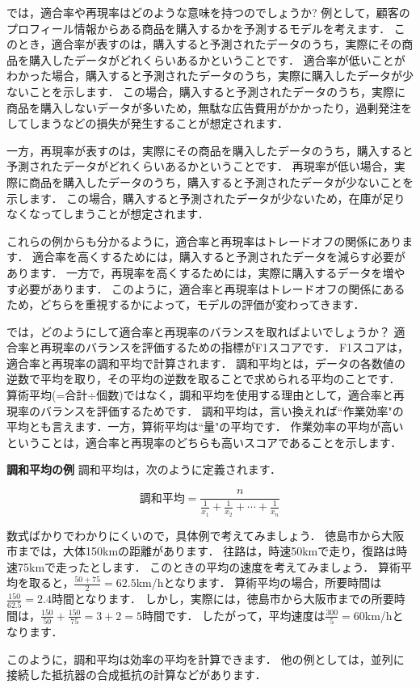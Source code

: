 \documentclass{jarticle}
\begin{document}
では，適合率や再現率はどのような意味を持つのでしょうか?
例として，顧客のプロフィール情報からある商品を購入するかを予測するモデルを考えます．
このとき，適合率が表すのは，購入すると予測されたデータのうち，実際にその商品を購入したデータがどれくらいあるかということです．
適合率が低いことがわかった場合，購入すると予測されたデータのうち，実際に購入したデータが少ないことを示します．
この場合，購入すると予測されたデータのうち，実際に商品を購入しないデータが多いため，無駄な広告費用がかかったり，過剰発注をしてしまうなどの損失が発生することが想定されます．

一方，再現率が表すのは，実際にその商品を購入したデータのうち，購入すると予測されたデータがどれくらいあるかということです．
再現率が低い場合，実際に商品を購入したデータのうち，購入すると予測されたデータが少ないことを示します．
この場合，購入すると予測されたデータが少ないため，在庫が足りなくなってしまうことが想定されます．

これらの例からも分かるように，適合率と再現率はトレードオフの関係にあります．
適合率を高くするためには，購入すると予測されたデータを減らす必要があります．
一方で，再現率を高くするためには，実際に購入するデータを増やす必要があります．
このように，適合率と再現率はトレードオフの関係にあるため，どちらを重視するかによって，モデルの評価が変わってきます．

では，どのようにして適合率と再現率のバランスを取ればよいでしょうか？
適合率と再現率のバランスを評価するための指標がF1スコアです．
F1スコアは，適合率と再現率の調和平均で計算されます．
調和平均とは，データの各数値の逆数で平均を取り，その平均の逆数を取ることで求められる平均のことです．
算術平均(=合計$\div$個数)ではなく，調和平均を使用する理由として，適合率と再現率のバランスを評価するためです．
調和平均は，言い換えれば``作業効率"の平均とも言えます．一方，算術平均は``量"の平均です．
作業効率の平均が高いということは，適合率と再現率のどちらも高いスコアであることを示します．

\begin{itembox}[l]{\textbf{調和平均の例}}
調和平均は，次のように定義されます．

\begin{equation}
  \text{調和平均} = \frac{n}{\frac{1}{x_1} + \frac{1}{x_2} + \cdots + \frac{1}{x_n}}
\end{equation}

数式ばかりでわかりにくいので，具体例で考えてみましょう．
徳島市から大阪市までは，大体150kmの距離があります．
往路は，時速50kmで走り，復路は時速75kmで走ったとします．
このときの平均の速度を考えてみましょう．
算術平均を取ると，$\frac{50 + 75}{2} = 62.5$km/hとなります．
算術平均の場合，所要時間は$\frac{150}{62.5} = 2.4$時間となります．
しかし，実際には，徳島市から大阪市までの所要時間は，$\frac{150}{50} + \frac{150}{75} = 3 + 2 = 5$時間です．
したがって，平均速度は$\frac{300}{5} = 60$km/hとなります．

このように，調和平均は効率の平均を計算できます．
他の例としては，並列に接続した抵抗器の合成抵抗の計算などがあります．
\end{itembox}
\end{document}
